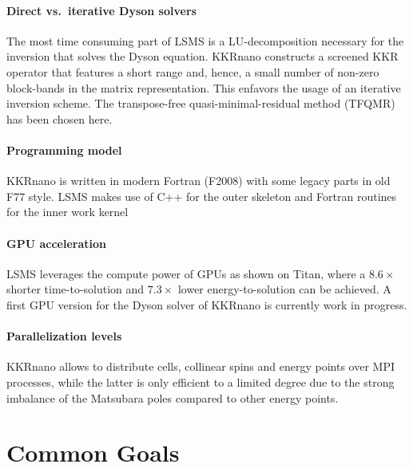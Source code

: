 \documentclass{llncs}
\def\KKRnano{{KKRnano}}
\def\LSMS{{LSMS}}
\begin{document}
\paragraph{Direct vs.~iterative Dyson solvers}
The most time consuming part of \LSMS{} is a LU-decomposition necessary 
for the inversion that solves the Dyson equation.
%
%
\KKRnano{} constructs a screened KKR operator that features a short range and, hence, a small number
of non-zero block-bands in the matrix representation. This enfavors the usage of an iterative
inversion scheme. The transpose-free quasi-minimal-residual method (TFQMR) has been chosen here.

\paragraph{Programming model}
\KKRnano{} is written in modern Fortran (F2008) with some legacy parts in old F77 style.
\LSMS{} makes use of C++ for the outer skeleton and Fortran routines for the inner work kernel
%

\paragraph{GPU acceleration}
\LSMS{} leverages the compute power of GPUs as shown on Titan, where a $8.6\times$ shorter
time-to-solution and $7.3\times$ lower energy-to-solution can be achieved.
A first GPU version for the Dyson solver of \KKRnano{} is currently work in progress.

\paragraph{Parallelization levels}
\KKRnano{} allows to distribute cells, collinear spins and energy points over MPI processes,
while the latter is only efficient to a limited degree due to the strong imbalance of the 
Matsubara poles compared to other energy points.

\section{Common Goals} \label{section:common}
\end{document}
